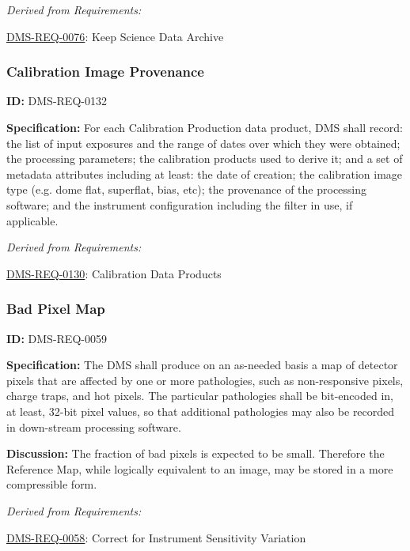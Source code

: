 \documentclass[SE,toc,lsstdraft]{lsstdoc}
\begin{document}
\emph{Derived from Requirements:}

\hyperref[DMS-REQ-0076]{DMS-REQ-0076}:
Keep Science Data Archive \newline


\subsubsection{Calibration Image Provenance}

\label{DMS-REQ-0132}
\textbf{ID:} DMS-REQ-0132

\textbf{Specification:} For each Calibration Production data product, DMS shall record: the list of input exposures and the range of dates over which they were obtained; the processing parameters; the calibration products used to derive it; and a set of metadata attributes including at least: the date of creation; the calibration image type (e.g. dome flat, superflat, bias, etc); the provenance of the processing software; and the instrument configuration including the filter in use, if applicable.






\emph{Derived from Requirements:}

\hyperref[DMS-REQ-0130]{DMS-REQ-0130}:
Calibration Data Products \newline


\subsubsection{Bad Pixel Map}

\label{DMS-REQ-0059}
\textbf{ID:} DMS-REQ-0059

\textbf{Specification: }The DMS shall produce on an as-needed basis a map of detector pixels that are affected by one or more pathologies, such as non-responsive pixels, charge traps, and hot pixels. The particular pathologies shall be bit-encoded in, at least, 32-bit pixel values, so that additional pathologies may also be recorded in down-stream processing software.

\textbf{Discussion:} The fraction of bad pixels is expected to be small. Therefore the Reference Map, while logically equivalent to an image, may be stored in a more compressible form.




\emph{Derived from Requirements:}

\hyperref[DMS-REQ-0058]{DMS-REQ-0058}:
Correct for Instrument Sensitivity Variation \newline
\end{document}
